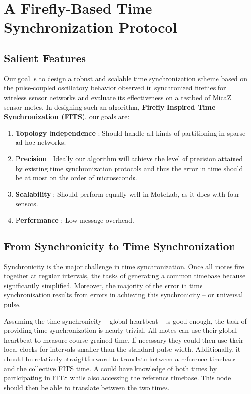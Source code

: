 
\section{A Firefly-Based Time Synchronization Protocol}

\subsection{Salient Features}
Our goal is to design a robust and scalable time synchronization scheme
based on the pulse-coupled oscillatory behavior observed in synchronized
fireflies for wireless sensor networks and evaluate its effectiveness
on a testbed of MicaZ sensor motes. 
In designing such an algorithm, {\bf Firefly Inspired Time Synchronization (FITS)}, 
our goals are:
\begin{enumerate}\addtolength{\itemsep}{-0.5\baselineskip}
\item {\bf Topology independence} : Should handle all kinds of partitioning
in sparse ad hoc networks.
\item {\bf Precision} : Ideally our algorithm will achieve the level of
precision attained by existing time synchronization protocols and thus the
error in time should be at most on the order of microseconds.
\item {\bf Scalability} : Should perform equally well in MoteLab, as it does 
with four sensors. 
\item {\bf Performance} : Low message overhead.
\end{enumerate}  


\subsection{From Synchronicity to Time Synchronization}
Synchronicity is the major challenge in time synchronization. Once all
motes fire together at regular intervals, the tasks of generating a
common timebase because significantly simplified. Moreover, the
majority of the error in time synchronization results from errors in
achieving this synchronicity -- or universal pulse.

Assuming the time synchronicity -- global heartbeat -- is good
enough, the task of providing time synchronization is nearly
trivial. All motes can use their global heartbeat to measure course
grained time. If necessary they could then use their local clocks for
intervals smaller than the standard pulse width. Additionally, it
should be relatively straightforward to translate between a reference
timebase and the collective FITS time. A could have knowledge of both
times by participating in FITS while also accessing the reference
timebase. This node should then be able to translate between the two
times.
